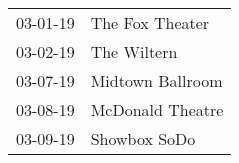 \begin{supertabular}{p{0.07\textwidth}p{0.23\textwidth}}
 03-01-19 &   The Fox Theater \\
 03-02-19 &       The Wiltern \\
 03-07-19 &  Midtown Ballroom \\
 03-08-19 &  McDonald Theatre \\
 03-09-19 &      Showbox SoDo \\
\end{supertabular}
